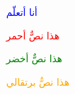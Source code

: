 ﻿\documentclass{article}
\begin{document}
\textcolor{blue}{أنا أتعلّم }\par
\textcolor{red}{هذا نصٌّ أحمر}\par
\textcolor{green}{هذا نصٌّ أخضر}\par
\textcolor{orange}{هذا نصٌّ برتقالي}\par
\end{document}
